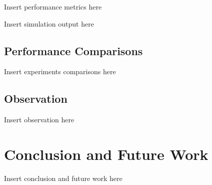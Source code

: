 \documentclass[conference]{IEEEtran}
\begin{document}
Insert performance metrics here


Insert simulation output here


\subsection{Performance Comparisons}

Insert experiments comparisons here


\subsection{Observation}

Insert observation here



\section{Conclusion and Future Work}

Insert conclusion and future work here

\end{document}
